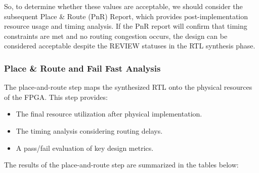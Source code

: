 \documentclass{article}
\begin{document}
So, to determine whether these values are acceptable, we should consider the subsequent Place \& Route (PnR) Report, which provides post-implementation resource usage and timing analysis. If the PnR report will confirm that timing constraints are met and no routing congestion occurs, the design can be considered acceptable despite the REVIEW statuses in the RTL synthesis phase.

\subsubsection{Place \& Route and Fail Fast Analysis}
The place-and-route step maps the synthesized RTL onto the physical resources of the FPGA. This step provides:
\begin{itemize}
    \item The final resource utilization after physical implementation.
    \item The timing analysis considering routing delays.
    \item A pass/fail evaluation of key design metrics.
\end{itemize}

The results of the place-and-route step are summarized in the tables below:
\end{document}
